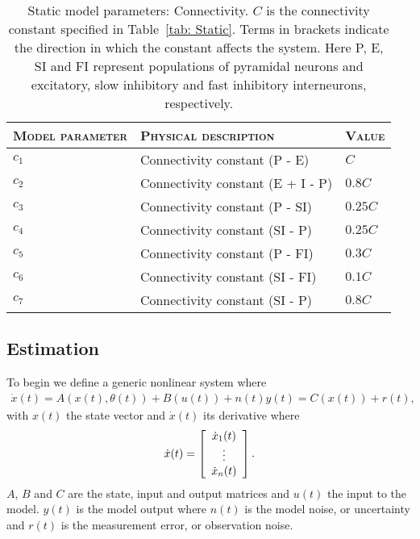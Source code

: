 \begin{center}
	\begin{table}
			\caption[Static Model Parameters: Connectivity]{Static model parameters: Connectivity. $C$ is the connectivity constant specified in Table~\ref{tab: Static}. Terms in brackets indicate the direction in which the constant affects the system. Here P, E, SI and FI represent populations of pyramidal neurons and excitatory, slow inhibitory and fast inhibitory interneurons, respectively.}
		\begin{tabular}{||p{4cm}|p{7cm}|p{2cm}||}\hline
			 \textsc{Model parameter}  & \textsc{Physical description} & \textsc{Value}
			   \\\hline\hline
			 $c_{1}$ & Connectivity constant (P - E) & $C$ \\\hline
			 $c_{2}$ & Connectivity constant (E + I - P) & $0.8C$ \\\hline
			 $c_{3}$ & Connectivity constant (P - SI) & $0.25C$  \\\hline
			 $c_{4}$ & Connectivity constant (SI - P)& $0.25C$ \\\hline
			 $c_{5}$ & Connectivity constant (P - FI) & $0.3C$ \\\hline
			 $c_{6}$ & Connectivity constant (SI - FI) & $0.1C$ \\\hline
			 $c_{7}$ & Connectivity constant (SI - P) & $0.8C$ \\\hline\hline
		\end{tabular}
		\label{tab: Connectivity}
	\end{table}
\end{center}

\subsection{Estimation}

To begin we define a generic nonlinear system where \begin{align}
\dot{x}(t) = A(x(t),\theta(t)) + B(u(t)) + n(t)
y(t)  = C(x(t)) +r(t),
\end{align} with $x(t)$ the state vector and $\dot{x}(t)$ its derivative where
\[ \dot{x}(t) = \left[ \begin{array}[pos]{c}
\dot{x}_{1}(t)\\
\vdots \\
\dot{x}_{n}(t) \end{array} \right] .\]  $A$, $B$ and $C$ are the state, input and output matrices and $u(t)$ the input to the model. $y(t)$ is the model output where $n(t)$ is the model noise, or uncertainty and $r(t)$ is the measurement error, or observation noise.

